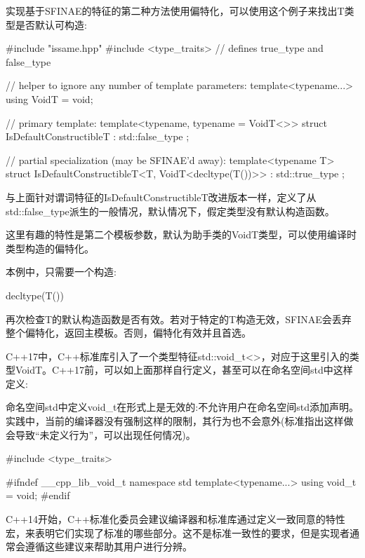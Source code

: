 实现基于SFINAE的特征的第二种方法使用偏特化，可以使用这个例子来找出T类型是否默认可构造:

\begin{cpp}
#include "issame.hpp"
#include <type_traits> // defines true_type and false_type

// helper to ignore any number of template parameters:
template<typename...> using VoidT = void;

// primary template:
template<typename, typename = VoidT<>>
struct IsDefaultConstructibleT : std::false_type
{
};

// partial specialization (may be SFINAE’d away):
template<typename T>
struct IsDefaultConstructibleT<T, VoidT<decltype(T())>> : std::true_type
{
};
\end{cpp}

与上面针对谓词特征的IsDefaultConstructibleT改进版本一样，定义了从std::false\_type派生的一般情况，默认情况下，假定类型没有默认构造函数。

这里有趣的特性是第二个模板参数，默认为助手类的VoidT类型，可以使用编译时类型构造的偏特化。

本例中，只需要一个构造:

\begin{cpp}
decltype(T())
\end{cpp}

再次检查T的默认构造函数是否有效。若对于特定的T构造无效，SFINAE会丢弃整个偏特化，返回主模板。否则，偏特化有效并且首选。

C++17中，C++标准库引入了一个类型特征std::void\_t<>，对应于这里引入的类型VoidT。C++17前，可以如上面那样自行定义，甚至可以在命名空间std中这样定义:

\begin{notice}命名空间std中定义void\_t在形式上是无效的:不允许用户在命名空间std添加声明。实践中，当前的编译器没有强制这样的限制，其行为也不会意外(标准指出这样做会导致“未定义行为”，可以出现任何情况)。
\end{notice}

\begin{cpp}
#include <type_traits>

#ifndef __cpp_lib_void_t
namespace std {
	template<typename...> using void_t = void;
}
#endif
\end{cpp}

C++14开始，C++标准化委员会建议编译器和标准库通过定义一致同意的特性宏，来表明它们实现了标准的哪些部分。这不是标准一致性的要求，但是实现者通常会遵循这些建议来帮助其用户进行分辨。

